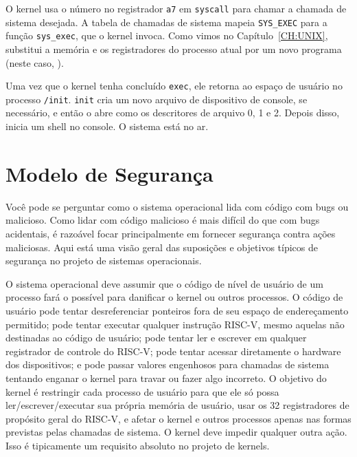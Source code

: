 O kernel usa o número no registrador {\tt a7} em \lstinline{syscall}
para chamar a chamada de sistema desejada.
A tabela de chamadas de sistema
mapeia \lstinline{SYS_EXEC} para a função \lstinline{sys_exec}, que o kernel invoca.
Como vimos no Capítulo~\ref{CH:UNIX},  substitui a memória e os registradores do processo atual por um novo programa (neste caso, ).

Uma vez que o kernel tenha concluído \lstinline{exec},
ele retorna ao espaço de usuário no processo
\lstinline{/init}.
\lstinline{init}
cria um novo arquivo de dispositivo de console, se necessário, e então o abre como os descritores de arquivo 0, 1 e 2.
Depois disso, inicia um shell no console.
O sistema está no ar.

\section{Modelo de Segurança}

Você pode se perguntar como o sistema operacional lida com código com bugs ou malicioso. Como lidar com código malicioso é mais difícil do que com bugs acidentais, é razoável focar principalmente em fornecer segurança contra ações maliciosas. Aqui está uma visão geral das suposições e objetivos típicos de segurança no projeto de sistemas operacionais.

O sistema operacional deve assumir que o código de nível de usuário de um processo fará o possível para danificar o kernel ou outros processos. O código de usuário pode tentar desreferenciar ponteiros fora de seu espaço de endereçamento permitido; pode tentar executar qualquer instrução RISC-V, mesmo aquelas não destinadas ao código de usuário; pode tentar ler e escrever em qualquer registrador de controle do RISC-V; pode tentar acessar diretamente o hardware dos dispositivos; e pode passar valores engenhosos para chamadas de sistema tentando enganar o kernel para travar ou fazer algo incorreto. O objetivo do kernel é restringir cada processo de usuário para que ele só possa ler/escrever/executar sua própria memória de usuário, usar os 32 registradores de propósito geral do RISC-V, e afetar o kernel e outros processos apenas nas formas previstas pelas chamadas de sistema. O kernel deve impedir qualquer outra ação. Isso é tipicamente um requisito absoluto no projeto de kernels.

